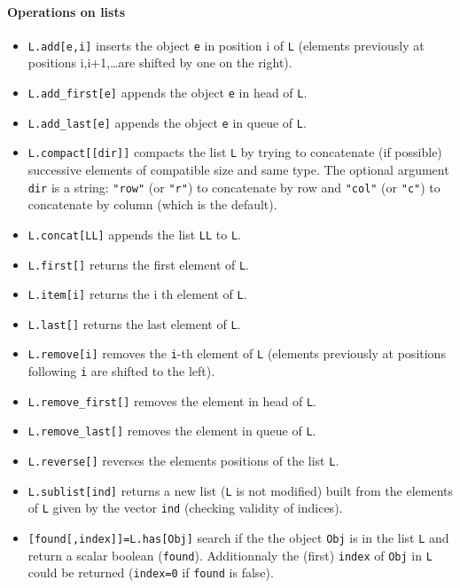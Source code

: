 \paragraph{Operations on lists}
\begin{itemize}
   \item \verb+L.add[e,i]+ inserts the object \verb+e+ in position i of \verb+L+
     (elements previously at positions i,i+1,\ldots are shifted by one on the right). 
   \item \verb+L.add_first[e]+ appends the object \verb+e+ in head of \verb+L+.
   \item \verb+L.add_last[e]+ appends the object \verb+e+ in queue of \verb+L+.
   \item \verb+L.compact[[dir]]+ compacts the list \verb+L+ by trying to concatenate (if possible) 
     successive elements of compatible size and same type. The optional argument \verb+dir+  
     is a string: \verb+"row"+ (or \verb+"r"+) to concatenate by row and \verb+"col"+ 
     (or \verb+"c"+) to concatenate by column (which is the default). 
   \item \verb+L.concat[LL]+ appends the list \verb+LL+ to \verb+L+.
   \item \verb+L.first[]+ returns the first element of \verb+L+.
   \item \verb+L.item[i]+ returns the i th element of \verb+L+.
   \item \verb+L.last[]+ returns the last element of \verb+L+.
   \item \verb+L.remove[i]+ removes the \verb+i+-th element of \verb+L+
     (elements previously at positions following \verb+i+  are shifted to the left).
   \item \verb+L.remove_first[]+ removes the element in head of \verb+L+.
   \item \verb+L.remove_last[]+ removes the element in queue of \verb+L+.
   \item \verb+L.reverse[]+ reverses the elements positions of the list  \verb+L+.
   \item \verb+L.sublist[ind]+ returns a new list (\verb+L+ is not modified) 
     built from the elements of \verb+L+ given by the vector \verb+ind+ (checking validity of indices).
   \item \verb+[found[,index]]=L.has[Obj]+ search if the the object \verb+Obj+ is 
     in the list \verb+L+ and return a scalar boolean (\verb+found+). Additionnaly the 
     (first) \verb+index+ of \verb+Obj+ in  \verb+L+ could be returned  
     (\verb+index=0+ if \verb+found+ is false).
\end{itemize}

